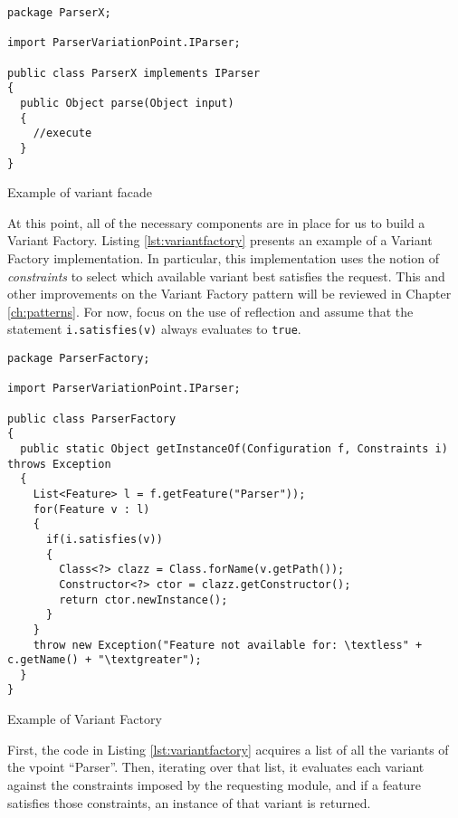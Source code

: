 \begin{listing}
\begin{verbatim}
package ParserX;

import ParserVariationPoint.IParser;

public class ParserX implements IParser
{
  public Object parse(Object input)
  {
    //execute
  }
}
\end{verbatim}
\caption{Example of \gls{variant} facade} \label{lst:variantfacade}
\end{listing}

At this point, all of the necessary components are in place for us to build a Variant Factory. Listing \ref{lst:variantfactory} presents an example of a Variant Factory implementation. In particular, this implementation uses the notion of \emph{constraints} to select which available \gls{variant} best satisfies the request. This and other improvements on the Variant Factory pattern will be reviewed in Chapter \ref{ch:patterns}. For now, focus on the use of reflection and assume that the statement \lstinline{i.satisfies(v)} always evaluates to \lstinline{true}.

\begin{listing}
\begin{verbatim}
package ParserFactory;

import ParserVariationPoint.IParser;

public class ParserFactory
{
  public static Object getInstanceOf(Configuration f, Constraints i) throws Exception
  {
    List<Feature> l = f.getFeature("Parser"));
    for(Feature v : l)
    {
      if(i.satisfies(v))
      {
        Class<?> clazz = Class.forName(v.getPath());
        Constructor<?> ctor = clazz.getConstructor();
        return ctor.newInstance();
      }
    }
    throw new Exception("Feature not available for: \textless" + c.getName() + "\textgreater");
  }
}
\end{verbatim}
\caption{Example of Variant Factory} \label{lst:variantfactory}
\end{listing}

First, the code in Listing \ref{lst:variantfactory} acquires a list of all the \gls{variant}s of the \gls{vpoint} ``Parser''. Then, iterating over that list, it evaluates each \gls{variant} against the constraints imposed by the requesting module, and if a feature satisfies those constraints, an instance of that \gls{variant} is returned.


